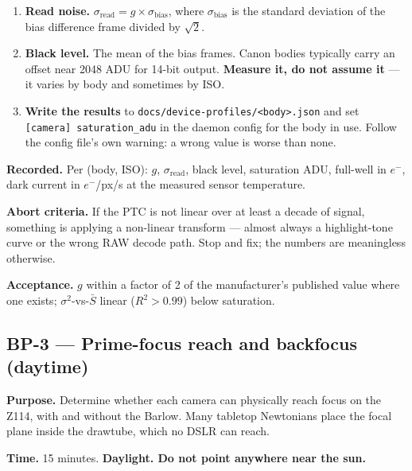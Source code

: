 \documentclass[11pt]{article}
\newcommand{\co}[1]{\texttt{\small #1}}
\begin{document}
\begin{enumerate}
\item \textbf{Read noise.} $\sigma_{\mathrm{read}} = g \times \sigma_{\mathrm{bias}}$,
      where $\sigma_{\mathrm{bias}}$ is the standard deviation of the bias
      difference frame divided by $\sqrt{2}$.

\item \textbf{Black level.} The mean of the bias frames. Canon bodies typically
      carry an offset near 2048 ADU for 14-bit output. \textbf{Measure it, do
      not assume it} --- it varies by body and sometimes by ISO.

\item \textbf{Write the results} to \co{docs/device-profiles/<body>.json} and
      set \co{[camera] saturation\_adu} in the daemon config for the body in
      use. Follow the config file's own warning: a wrong value is worse than
      none.
\end{enumerate}

\textbf{Recorded.} Per (body, ISO): $g$, $\sigma_{\mathrm{read}}$, black level,
saturation ADU, full-well in $e^-$, dark current in $e^-$/px/s at the measured
sensor temperature.

\textbf{Abort criteria.} If the PTC is not linear over at least a decade of
signal, something is applying a non-linear transform --- almost always a
highlight-tone curve or the wrong RAW decode path. Stop and fix; the numbers are
meaningless otherwise.

\textbf{Acceptance.} $g$ within a factor of 2 of the manufacturer's published
value where one exists; $\sigma^2$-vs-$\bar{S}$ linear ($R^2 > 0.99$) below
saturation.

\subsection*{BP-3 --- Prime-focus reach and backfocus (daytime)}

\textbf{Purpose.} Determine whether each camera can physically reach focus on
the Z114, with and without the Barlow. Many tabletop Newtonians place the focal
plane inside the drawtube, which no DSLR can reach.

\textbf{Time.} 15 minutes. \textbf{Daylight. Do not point anywhere near the
sun.}
\end{document}
